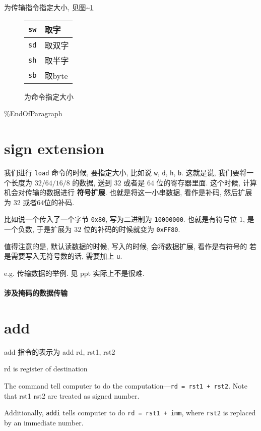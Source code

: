 \documentclass[11pt]{article}
\begin{document}
为传输指令指定大小, 见图\textasciitilde{}\ref{tab:daxiao}
\begin{figure}
		\centering
		\begin{tabular}{|c|l|}
		\hline 
		\texttt{sw} &  取字   \\ \hline 
		\texttt{sd} &  取双字 \\ \hline 
		\texttt{sh} &  取半字 \\ \hline 
		\texttt{sb} &  取byte \\ \hline 
		\end{tabular}
		\caption{为命令指定大小}\label{tab:daxiao}
\end{figure}
\%EndOfParagraph 

\section{sign extension}
\label{sec:org9ee86cd}

我们进行 \texttt{load} 命令的时候, 要指定大小, 比如说 \texttt{w}, \texttt{d}, \texttt{h}, \texttt{b}.
这就是说, 我们要将一个长度为 \(32/64/16/8\) 的数据, 送到 \(32\) 或者是 \(64\) 位的寄存器里面. 这个时候, 
计算机会对传输的数据进行 \textbf{符号扩展}. 也就是将这一小串数据, 看作是补码, 然后扩展为 \(32\) 或者\(64\)位的补码. 

比如说一个传入了一个字节 \texttt{0x80}, 写为二进制为 \texttt{10000000}. 也就是有符号位 \(1\), 是一个负数, 于是扩展为 \(32\) 位的补码的时候就变为 \texttt{0xFF80}.

值得注意的是, 默认读数据的时候, 写入的时候, 会将数据扩展, 看作是有符号的
若是需要写入无符号数的话, 需要加上 \texttt{u}. 

e.g. 传输数据的举例. 见 ppt 实际上不是很难. 

\paragraph{涉及掩码的数据传输}

\section{add}
\label{sec:orgc9a202c}
add 指令的表示为 
add rd, rst1, rst2

rd is register of destination

The command tell computer to do the computation---\texttt{rd = rst1 + rst2}. Note that rst1 rst2 are treated as signed number. 


Additionally, \texttt{addi} tells computer to do \texttt{rd = rst1 + imm}, where \texttt{rst2} is replaced by an immediate number.
\end{document}

